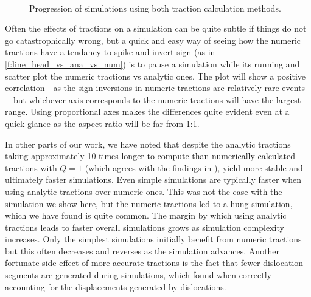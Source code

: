 \documentclass[11pt]{iopart}
\begin{document}
\begin{figure}
    ~
    ~
    \caption{Progression of simulations using both traction calculation methods.}
    \label{f:simulation}
\end{figure}

Often the effects of tractions on a simulation can be quite subtle if things do not go catastrophically wrong, but a quick and easy way of seeing how the numeric tractions have a tendancy to spike and invert sign (as in \cref{f:line_head_vs_ana_vs_num}) is to pause a simulation while its running and scatter plot the numeric tractions vs analytic ones. The plot will show a positive correlation---as the sign inversions in numeric tractions are relatively rare events---but whichever axis corresponds to the numeric tractions will have the largest range. Using proportional axes makes the differences quite evident even at a quick glance as the aspect ratio will be far from 1:1.

In other parts of our work, we have noted that despite the analytic tractions taking approximately 10 times longer to compute than numerically calculated tractions with $Q = 1$ (which agrees with the findings in \cite{Queyreau}), yield more stable and ultimately faster simulations. Even simple simulations are typically faster when using analytic tractions over numeric ones. This was not the case with the simulation we show here, but the numeric tractions led to a hung simulation, which we have found is quite common. The margin by which using analytic tractions leads to faster overall simulations grows as simulation complexity increases. Only the simplest simulations initially benefit from numeric tractions but this often decreases and reverses as the simulation advances. Another fortunate side effect of more accurate tractions is the fact that fewer dislocation segments are generated during simulations, which \citet{bromage2018calculating} found when correctly accounting for the displacements generated by dislocations.
\end{document}
